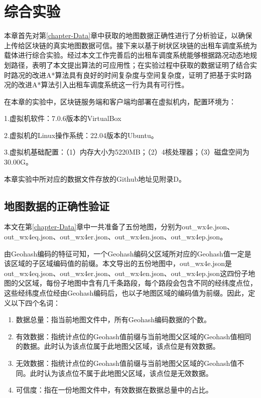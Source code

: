 \chapter{综合实验}

本章首先对第\ref{chapter-Data}章中获取的地图数据正确性进行了分析验证，以确保上传给区块链的真实地图数据可信。接下来以基于树状区块链的出租车调度系统为载体进行综合实验。经过本文工作完善后的出租车调度系统能够根据路况动态地规划路径，表明了本文提出算法的可应用性；在实验过程中获取的数据证明了结合实时路况的改进A*算法具有良好的时间复杂度与空间复杂度，证明了把基于实时路况的改进A*算法引入出租车调度系统这一行为具有可行性。

在本章的实验中，区块链服务端和客户端均部署在虚拟机内，配置环境为：

1.虚拟机软件：7.0.6版本的VirtualBox

2.虚拟机的Linux操作系统：22.04版本的Ubuntu。

3.虚拟机基础配置：（1）内存大小为5220MB；（2）4核处理器；（3）磁盘空间为30.00G。

本章实验中所对应的数据文件存放的Github地址见附录D。

\section{地图数据的正确性验证}

本文在第\ref{chapter-Data}章中一共准备了五份地图，分别为out\_wx4e.json、out\_wx4eq.json、out\_wx4er.json、out\_wx4en.json、out\_wx4ep.json。

由Geohash编码的特征可知，一个Geohash编码父区域所对应的Geohash值一定是该区域的子区域编码值的前缀。本文导出的五份地图中，out\_wx4e.json是out\_wx4eq.json、out\_wx4er.json、out\_wx4en.json、out\_wx4ep.json这四份子地图的父区域，每份子地图中含有几千条路段，每个路段会包含不同的经纬度点位，这些经纬度点位经由Geohash编码后，也以子地图区域的编码值为前缀。因此，定义以下四个名词：

\begin{enumerate}
    \item 数据总量：指当前地图文件中，所有Geohash编码数据的个数。
    \item 有效数据：指统计点位的Geohash值前缀与当前地图父区域的Geohash值相同的数据。此时认为该点位属于此地图父区域，该点位是有效数据。
    \item 无效数据：指统计点位的Geohash值前缀与当前地图父区域的Geohash值不同。此时认为该点位不属于此地图父区域，该点位是无效数据。
    \item 可信度：指在一份地图文件中，有效数据在数据总量中的占比。
\end{enumerate}

